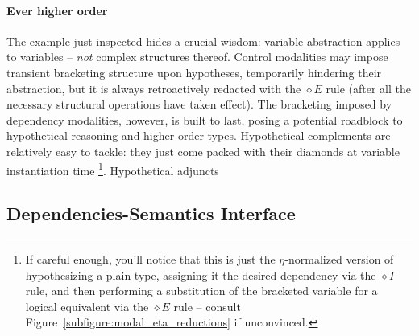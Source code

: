 \paragraph{Ever higher order}
The example just inspected hides a crucial wisdom: variable abstraction applies to variables -- \textit{not} complex structures thereof.
Control modalities may impose transient bracketing structure upon hypotheses, temporarily hindering their abstraction, but it is always retroactively redacted with the $\diamond E$ rule (after all the necessary structural operations have taken effect).
The bracketing imposed by dependency modalities, however, is built to last, posing a potential roadblock to hypothetical reasoning and higher-order types.
Hypothetical complements are relatively easy to tackle: they just come packed with their diamonds at variable instantiation time%
	\footnote{If careful enough, you'll notice that this is just the $\eta$-normalized version of hypothesizing a plain type, assigning it the desired dependency via the $\diamond I$ rule, and then performing a substitution of the bracketed variable for a logical equivalent via the $\diamond E$ rule -- consult Figure~\ref{subfigure:modal_eta_reductions} if unconvinced.}.
Hypothetical adjuncts




\subsection{Dependencies-Semantics Interface}


